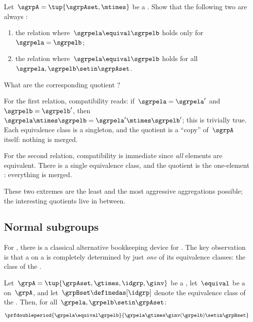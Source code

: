 \begin{exercise}
    \label{ex:trivial-congruences}
    Let~$\sgrpA = \tup{\sgrpAset, \mtimes}$ be a .
    Show that the following two  are always :
    \begin{enumerate}
        \item the relation where~$\sgrpela \equival \sgrpelb$ holds only for~$\sgrpela = \sgrpelb$;
        \item the relation where~$\sgrpela \equival \sgrpelb$ holds for all~$\sgrpela, \sgrpelb \setin \sgrpAset$.
    \end{enumerate}
    What are the corresponding quotient ?
\end{exercise}
\begin{solution}
    For the first relation, compatibility reads: if~$\sgrpela = \sgrpela'$ and~$\sgrpelb = \sgrpelb'$, then~$\sgrpela \mtimes \sgrpelb = \sgrpela' \mtimes \sgrpelb'$; this is trivially true.
    Each equivalence class is a singleton, and the quotient is a ``copy'' of~$\sgrpA$ itself: nothing is merged.

    For the second relation, compatibility is immediate since \emph{all} elements are equivalent.
    There is a single equivalence class, and the quotient is the one-element : everything is merged.

    These two extremes are the least and the most aggressive aggregations possible; the interesting quotients live in between.
\end{solution}

\subsection{Normal subgroups}

For , there is a classical alternative bookkeeping device for .
The key observation is that a  on a  is completely determined by just \emph{one} of its equivalence classes: the class of the .

\begin{lemma}
    \label{lem:congruence-determined-by-neutral-class}
    Let~$\grpA = \tup{\grpAset, \gtimes, \idgrp, \ginv}$ be a , let~$\equival$ be a  on~$\grpA$, and let~$\grpBset \definedas [\idgrp]$ denote the equivalence class of the .
    Then, for all~$\grpela, \grpelb \setin \grpAset$:
    \begin{equation}
        \label{eq:congruence-from-normal-subgroup}
        \prfdoubleperiod{
            \grpela \equival \grpelb
        }{
            \grpela \gtimes \ginv(\grpelb) \setin \grpBset
        }
    \end{equation}
\end{lemma}

